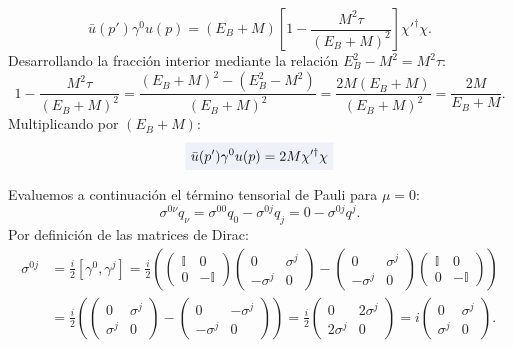 \documentclass[10pt,a4paper]{article}
\newcommand{\dest}[1]{{\setlength{\fboxsep}{4pt}\colorbox{colordest}{$\displaystyle #1$}}}
\begin{document}
\begin{equation}
\bar{u}(p') \gamma^0 u(p) = (E_B + M) \left[ 1 - \frac{M^2 \tau}{(E_B + M)^2} \right] \chi'^\dagger \chi.
\end{equation}
Desarrollando la fracción interior mediante la relación $E_B^2 - M^2 = M^2 \tau$:
\begin{equation}
1 - \frac{M^2 \tau}{(E_B + M)^2} = \frac{(E_B + M)^2 - (E_B^2 - M^2)}{(E_B + M)^2} = \frac{2 M (E_B + M)}{(E_B + M)^2} = \frac{2 M}{E_B + M}.
\end{equation}
Multiplicando por $(E_B + M)$:
\begin{equation}
\dest{\bar{u}(p') \gamma^0 u(p) = 2 M \chi'^\dagger \chi}
\label{eq:breit_gamma0_exact}
\end{equation}

Evaluemos a continuación el término tensorial de Pauli para $\mu = 0$:
\begin{equation}
\sigma^{0\nu} q_\nu = \sigma^{00} q_0 - \sigma^{0j} q_j = 0 - \sigma^{0j} q^j.
\end{equation}
Por definición de las matrices de Dirac:
\begin{align}
\sigma^{0j} &= \frac{i}{2} [\gamma^0, \gamma^j] = \frac{i}{2} \left( \begin{pmatrix} \mathbb{I} & 0 \\ 0 & -\mathbb{I} \end{pmatrix} \begin{pmatrix} 0 & \sigma^j \\ -\sigma^j & 0 \end{pmatrix} - \begin{pmatrix} 0 & \sigma^j \\ -\sigma^j & 0 \end{pmatrix} \begin{pmatrix} \mathbb{I} & 0 \\ 0 & -\mathbb{I} \end{pmatrix} \right) \nonumber \\
&= \frac{i}{2} \left( \begin{pmatrix} 0 & \sigma^j \\ \sigma^j & 0 \end{pmatrix} - \begin{pmatrix} 0 & -\sigma^j \\ -\sigma^j & 0 \end{pmatrix} \right) = \frac{i}{2} \begin{pmatrix} 0 & 2\sigma^j \\ 2\sigma^j & 0 \end{pmatrix} = i \begin{pmatrix} 0 & \sigma^j \\ \sigma^j & 0 \end{pmatrix}.
\end{align}
\end{document}
